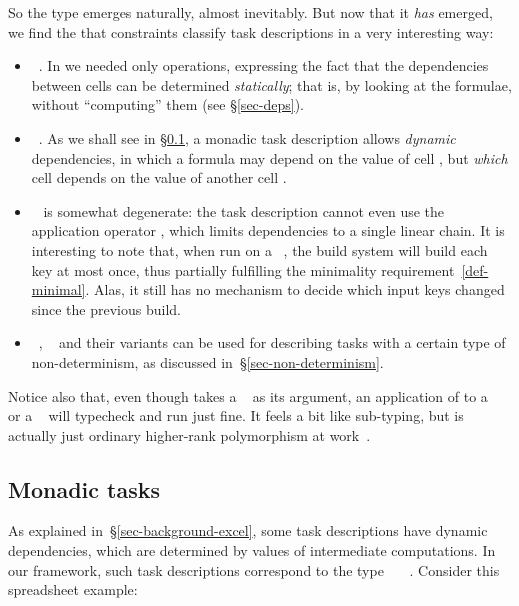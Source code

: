 So the type  emerges naturally, almost inevitably.  But now that
it \emph{has} emerged, we find the that constraints  classify task descriptions
in a very interesting way:
\begin{itemize}
\item {}~. In  we needed only 
  operations, expressing the fact that the dependencies between cells can be
  determined \emph{statically}; that is, by looking at the formulae, without
  ``computing'' them (see \S\ref{sec-deps}).
\item {}~. As we shall see in \S\ref{sec-task-monad}, a monadic task
  description allows \emph{dynamic} dependencies, in which a formula may depend
  on the value of cell , but \emph{which} cell  depends on the
  value of another cell .
\item {}~ is somewhat degenerate: the task description cannot
  even use the application operator \hs{<*>}, which limits dependencies to a
  single linear chain. It is interesting to note that, when run on a
  ~, the  build system will build each key at most
  once, thus partially fulfilling the minimality requirement~\ref{def-minimal}.
  Alas, it still has no mechanism to decide which input keys changed since the
  previous build.
\item {}~, ~ and their
  variants can be used for describing tasks with a certain type of
  non-determinism, as discussed in~\S\ref{sec-non-determinism}.
\end{itemize}

Notice also that, even though  takes a ~ as its
argument, an application of  to a ~ or
a ~ will typecheck and run just fine. It feels a bit like
sub-typing, but is actually just ordinary higher-rank polymorphism at
work~\cite{jones2007practical}.

\subsection{Monadic tasks}\label{sec-task-monad}

As explained in~\S\ref{sec-background-excel}, some task descriptions have dynamic
dependencies, which are determined by values of intermediate computations. In
our framework, such task descriptions correspond to the type
~~~. Consider this spreadsheet example:

